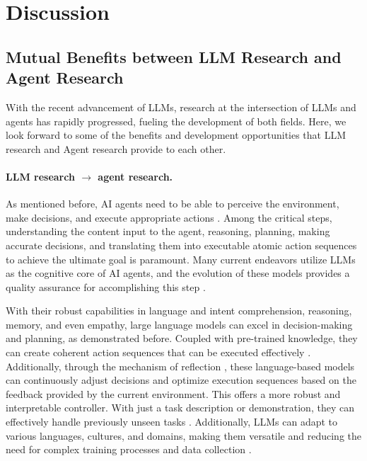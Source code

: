 \section{Discussion }\label{sec:Discussion}

\subsection{Mutual Benefits between LLM Research and Agent Research}\label{sec:Mutual Benefits of LLM Research and Agent Research}
With the recent advancement of LLMs, research at the intersection of LLMs and agents has rapidly progressed, fueling the development of both fields. 
Here, we look forward to some of the benefits and development opportunities that LLM research and Agent research provide to each other.


\paragraph{LLM research $\rightarrow$ agent research.} 
As mentioned before, AI agents need to be able to perceive the environment, make decisions, and execute appropriate actions \cite{DBLP:journals/ker/WooldridgeJ95,DBLP:journals/logcom/Goodwin95}. Among the critical steps, understanding the content input to the agent, reasoning, planning, making accurate decisions, and translating them into executable atomic action sequences to achieve the ultimate goal is paramount. Many current endeavors utilize LLMs as the cognitive core of AI agents, and the evolution of these models provides a quality assurance for accomplishing this step \cite{DBLP:journals/corr/abs-2304-03442,gravitasauto,nakajima2023babyagi,DBLP:journals/corr/abs-2308-10848}.


With their robust capabilities in language and intent comprehension, reasoning, memory, and even empathy, large language models can excel in decision-making and planning, as demonstrated before. Coupled with pre-trained knowledge, they can create coherent action sequences that can be executed effectively \cite{DBLP:journals/corr/abs-2302-01560,DBLP:conf/icml/HuangAPM22,DBLP:journals/corr/abs-2308-03427}.
Additionally, through the mechanism of reflection \cite{DBLP:journals/corr/abs-2303-11366,DBLP:journals/corr/abs-2303-17651}, these language-based models can continuously adjust decisions and optimize execution sequences based on the feedback provided by the current environment. This offers a more robust and interpretable controller. 
With just a task description or demonstration, they can effectively handle previously unseen tasks \cite{DBLP:conf/nips/Ouyang0JAWMZASR22, DBLP:conf/iclr/SanhWRBSACSRDBX22, DBLP:conf/acl/BachSYWRNSKBFAD22}. Additionally, LLMs can adapt to various languages, cultures, and domains, making them versatile and reducing the need for complex training processes and data collection \cite{DBLP:journals/corr/abs-2303-12712,DBLP:journals/corr/abs-2302-04023}. 


